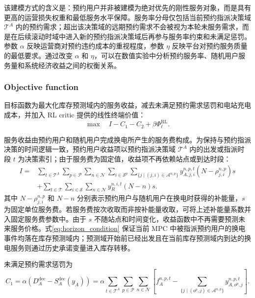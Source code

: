 \documentclass[12pt,hyperref,a4paper,UTF8]{ctexart}
\begin{document}
该建模方式的含义是：预约用户并非被建模为绝对优先的刚性服务对象，而是具有更高的运营损失权重和最低服务水平保障。服务率分母仅包括当前预约指派决策域 $\mathcal{T}^{A}$ 内的预约需求；超出该决策域的远期预约需求不会被视为本轮未服务需求，而是在后续滚动时域中进入新的预约指派决策域后再参与服务率约束和未满足惩罚。参数 $\alpha$ 反映运营商对预约违约成本的重视程度，参数 $\eta$ 反映平台对预约服务质量的最低要求。通过改变 $\alpha$ 和 $\eta$，可以在数值实验中分析预约服务率、随机用户服务量和系统经济收益之间的权衡关系。

\subsubsection{Objective function}

目标函数为最大化库存预测域内的服务收益，减去未满足预约需求惩罚和电站充电成本，并加入 RL critic 提供的线性终端价值：
\begin{equation}
\max \quad I-C_1-C_2+\beta\Phi^{\mathrm{RL}}_{\ell}.
\label{eq:objective}
\end{equation}

服务收益由预约用户和随机用户完成换电所产生的服务费构成。为保持与预约指派决策的时间逻辑一致，预约用户收益项以预约指派决策域 $\mathcal{T}^{A}$ 内的出发或指派时段 $t$ 为决策索引；由于服务费为固定值，收益项不再依赖站点或到达时段：
\begin{equation}
\begin{aligned}
I=&
\sum_{t\in\mathcal{T}^{A}}\sum_{p\in\mathcal{P}}\sum_{n\in\mathcal{N}}
\sum_{i\in\mathcal{S}^{p}}
\sum_{\{j\mid (j,i)\in\mathcal{A}^{n,p}\}}
 y_{A,j,i}^{n,p,t}
\left(N-\rho_{j,i}^{n,p}\right)s
\\
&+
\sum_{t\in\mathcal{T}}\sum_{i\in\mathcal{S}}\sum_{n\in\mathcal{N}}
y_R^{n,i,t}(N-n)s.
\end{aligned}
\label{eq:income}
\end{equation}
其中 $N-\rho_{j,i}^{n,p}$ 和 $N-n$ 分别表示预约用户与随机用户在换电时获得的补能量，$s$ 为固定单位服务费。若服务费按次收取而非按补能量收取，可将上述补能量系数并入固定服务费参数中。由于 $s$ 不随站点和时间变化，收益函数中不再需要预测未来服务价格。式\eqref{eq:horizon_condition} 保证当前 MPC 中被指派预约用户的换电事件均落在库存预测域内；预测域开始前已经出发且在当前库存预测域内到达的换电服务则通过历史承诺变量进入库存转移。

未满足预约需求惩罚为
\begin{equation}
C_1 = \alpha \left(D_A^{\mathrm{dec}}-S_A^{\mathrm{dec}}(y_A)\right)
=\alpha \sum_{t\in \mathcal{T}^{A}} \sum_{p\in \mathcal{P}}  \sum_{n\in \mathcal{N}} 
\left[
f_A^{n,p,t} - \sum_{\{j \mid (o^p,j) \in \mathcal{A}^{n,p}\}} y_{A,o^p,j}^{n,p,t} \right].
\label{eq:penaltycost}
\end{equation}
\end{document}
